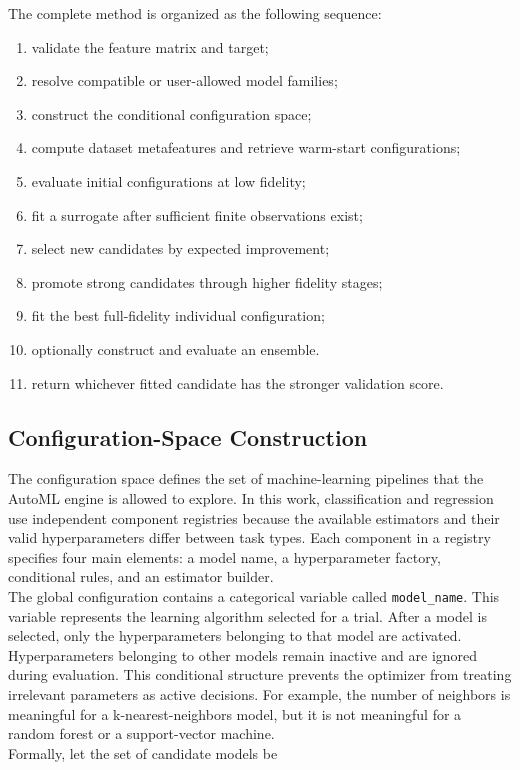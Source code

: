 \documentclass[12pt,a4paper,oneside]{report}
\begin{document}
The complete method is organized as the following sequence:

\begin{enumerate}[leftmargin=*]
  \item validate the feature matrix and target;
  \item resolve compatible or user-allowed model families;
  \item construct the conditional configuration space;
  \item compute dataset metafeatures and retrieve warm-start configurations;
  \item evaluate initial configurations at low fidelity;
  \item fit a surrogate after sufficient finite observations exist;
  \item select new candidates by expected improvement;
  \item promote strong candidates through higher fidelity stages;
  \item fit the best full-fidelity individual configuration;
  \item optionally construct and evaluate an ensemble.
  \item return whichever fitted candidate has the stronger validation score.
\end{enumerate}

\subsection{Configuration-Space Construction}

The configuration space defines the set of machine-learning pipelines that the
AutoML engine is allowed to explore. In this work, classification and regression
use independent component registries because the available estimators and their
valid hyperparameters differ between task types. Each component in a registry
specifies four main elements: a model name, a hyperparameter factory, conditional
rules, and an estimator builder.
\\
The global configuration contains a categorical variable called
\texttt{model\_name}. This variable represents the learning algorithm selected
for a trial. After a model is selected, only the hyperparameters belonging to
that model are activated. Hyperparameters belonging to other models remain
inactive and are ignored during evaluation. This conditional structure prevents
the optimizer from treating irrelevant parameters as active decisions. For
example, the number of neighbors is meaningful for a k-nearest-neighbors model,
but it is not meaningful for a random forest or a support-vector machine.
\\
Formally, let the set of candidate models be
\end{document}
